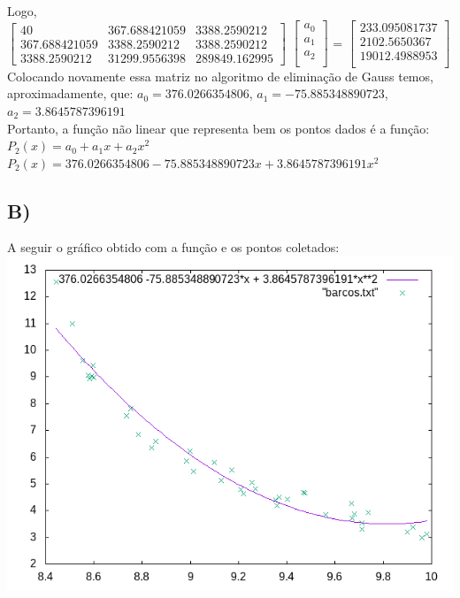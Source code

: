 \documentclass{article}
\begin{document}
    Logo, \\
    $\begin{bmatrix}
        40 & 367.688421059 & 3388.2590212\\
        367.688421059 & 3388.2590212 & 3388.2590212\\
        3388.2590212 & 31299.9556398 & 289849.162995
    \end{bmatrix}$
    $\begin{bmatrix}
        a_0\\
        a_1\\
        a_2\\
    \end{bmatrix}$
    = $\begin{bmatrix}
        233.095081737\\
        2102.5650367\\
        19012.4988953\\
    \end{bmatrix}$\\
    Colocando novamente essa matriz no algoritmo de eliminação de Gauss temos, aproximadamente, que:
    $a_0 = 376.0266354806$, $a_1 = -75.885348890723$, $a_2 = 3.8645787396191$\\
    Portanto, a função não linear que representa bem os pontos dados é a função:\\
    $P_2(x) = a_0 + a_1x + a_2x^2$\\
$P_2(x) = 376.0266354806 -75.885348890723x + 3.8645787396191x^2$  

    \subsection*{B)}A seguir o gráfico obtido com a função e os pontos coletados:\\
    \includegraphics[scale=0.8]{barcos.png}
    
\end{document}
